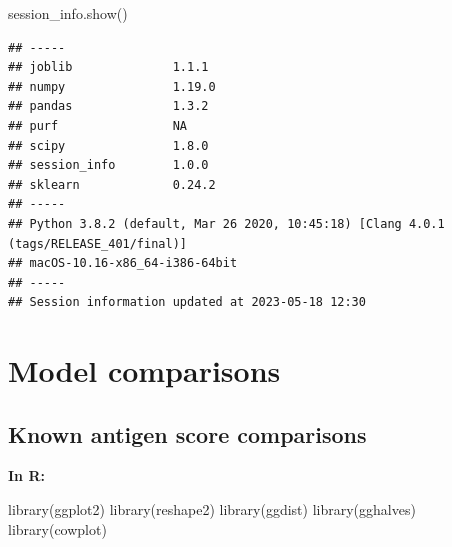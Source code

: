 \documentclass[
  11pt,
  oneside]{book}
\newenvironment{Shaded}{\begin{snugshade}}{\end{snugshade}}
\newcommand{\FunctionTok}[1]{\textcolor[rgb]{0.00,0.00,0.00}{#1}}
\newcommand{\NormalTok}[1]{#1}
\begin{document}
\begin{Shaded}
\begin{Highlighting}[]
\NormalTok{session\_info.show()}
\end{Highlighting}
\end{Shaded}

\begin{verbatim}
## -----
## joblib              1.1.1
## numpy               1.19.0
## pandas              1.3.2
## purf                NA
## scipy               1.8.0
## session_info        1.0.0
## sklearn             0.24.2
## -----
## Python 3.8.2 (default, Mar 26 2020, 10:45:18) [Clang 4.0.1 (tags/RELEASE_401/final)]
## macOS-10.16-x86_64-i386-64bit
## -----
## Session information updated at 2023-05-18 12:30
\end{verbatim}

\hypertarget{04_model_comparisons}{%
\chapter{Model comparisons}\label{04_model_comparisons}}

\hypertarget{known-antigen-score-comparisons}{%
\section{Known antigen score comparisons}\label{known-antigen-score-comparisons}}

\textbf{In R: }

\begin{Shaded}
\begin{Highlighting}[]
\FunctionTok{library}\NormalTok{(ggplot2)}
\FunctionTok{library}\NormalTok{(reshape2)}
\FunctionTok{library}\NormalTok{(ggdist)}
\FunctionTok{library}\NormalTok{(gghalves)}
\FunctionTok{library}\NormalTok{(cowplot)}
\end{Highlighting}
\end{Shaded}
\end{document}
